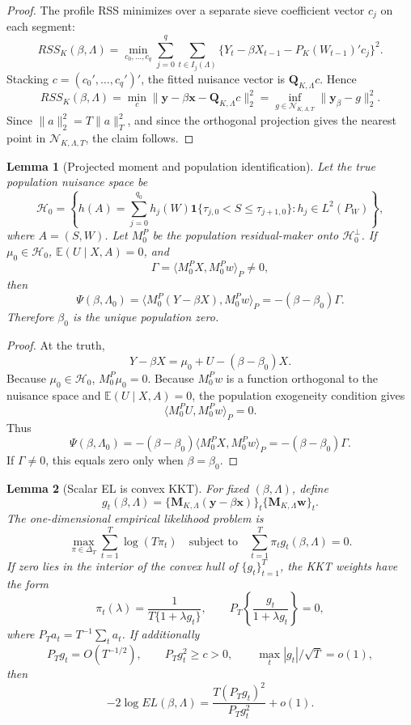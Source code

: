 \documentclass[12pt]{article}
\numberwithin{equation}{section}
\newtheorem{lemma}{Lemma}
\theoremstyle{definition}
\newcommand{\E}{\mathbb E}
\newcommand{\ind}{\mathbf 1}
\newcommand{\N}{\mathcal N}
\newcommand{\Hh}{\mathcal H}
\newcommand{\innerP}[2]{\langle #1,#2\rangle_P}
\begin{document}
\begin{proof}
The profile RSS minimizes over a separate sieve coefficient vector \(c_j\) on
each segment:
\[
    RSS_K(\beta,\Lambda)
    =
    \min_{c_0,\ldots,c_q}
    \sum_{j=0}^q\sum_{t\in I_j(\Lambda)}
    \{Y_t-\beta X_{t-1}-P_K(W_{t-1})'c_j\}^2.
\]
Stacking \(c=(c_0',\ldots,c_q')'\), the fitted nuisance vector is
\(\bm Q_{K,\Lambda}c\). Hence
\[
    RSS_K(\beta,\Lambda)
    =
    \min_c\|\bm y-\beta\bm x-\bm Q_{K,\Lambda}c\|_2^2
    =
    \inf_{g\in\N_{K,\Lambda,T}}\|\bm y_\beta-g\|_2^2.
\]
Since \(\|a\|_2^2=T\|a\|_T^2\), and since the orthogonal projection gives the
nearest point in \(\N_{K,\Lambda,T}\), the claim follows.
\end{proof}

\begin{lemma}[Projected moment and population identification]
\label{lem:min-pop-ident}
Let the true population nuisance space be
\[
    \Hh_0
    =
    \left\{
    h(A)=\sum_{j=0}^{q_0}h_j(W)
    \ind\{\tau_{j,0}<S\le \tau_{j+1,0}\}:h_j\in L^2(P_W)
    \right\},
\]
where \(A=(S,W)\). Let \(M_0^P\) be the population residual-maker onto
\(\Hh_0^\perp\). If \(\mu_0\in\Hh_0\), \(\E(U\mid X,A)=0\), and
\[
    \Gamma=\innerP{M_0^PX}{M_0^Pw}\ne0,
\]
then
\[
    \Psi(\beta,\Lambda_0)
    =
    \innerP{M_0^P(Y-\beta X)}{M_0^Pw}
    =
    -(\beta-\beta_0)\Gamma.
\]
Therefore \(\beta_0\) is the unique population zero.
\end{lemma}

\begin{proof}
At the truth,
\[
    Y-\beta X=\mu_0+U-(\beta-\beta_0)X.
\]
Because \(\mu_0\in\Hh_0\), \(M_0^P\mu_0=0\). Because \(M_0^Pw\) is a function
orthogonal to the nuisance space and \(\E(U\mid X,A)=0\), the population
exogeneity condition gives
\[
    \innerP{M_0^PU}{M_0^Pw}=0.
\]
Thus
\[
    \Psi(\beta,\Lambda_0)
    =
    -(\beta-\beta_0)\innerP{M_0^PX}{M_0^Pw}
    =
    -(\beta-\beta_0)\Gamma.
\]
If \(\Gamma\ne0\), this equals zero only when \(\beta=\beta_0\).
\end{proof}

\begin{lemma}[Scalar EL is convex KKT]
\label{lem:min-el-kkt}
For fixed \((\beta,\Lambda)\), define
\[
    g_t(\beta,\Lambda)
    =
    \{\bm M_{K,\Lambda}(\bm y-\beta\bm x)\}_t
    \{\bm M_{K,\Lambda}\bm w\}_t.
\]
The one-dimensional empirical likelihood problem is
\[
    \max_{\pi\in\Delta_T}\sum_{t=1}^T\log(T\pi_t)
    \quad\text{subject to}\quad
    \sum_{t=1}^T\pi_tg_t(\beta,\Lambda)=0.
\]
If zero lies in the interior of the convex hull of \(\{g_t\}_{t=1}^T\), the KKT
weights have the form
\[
    \pi_t(\lambda)=\frac{1}{T\{1+\lambda g_t\}},
    \qquad
    P_T\left\{\frac{g_t}{1+\lambda g_t}\right\}=0,
\]
where \(P_Ta_t=T^{-1}\sum_ta_t\). If additionally
\[
    P_Tg_t=O(T^{-1/2}),\qquad
    P_Tg_t^2\ge c>0,\qquad
    \max_t|g_t|/\sqrt T=o(1),
\]
then
\[
    -2\log EL(\beta,\Lambda)
    =
    \frac{T(P_Tg_t)^2}{P_Tg_t^2}+o(1).
\]
\end{lemma}
\end{document}
